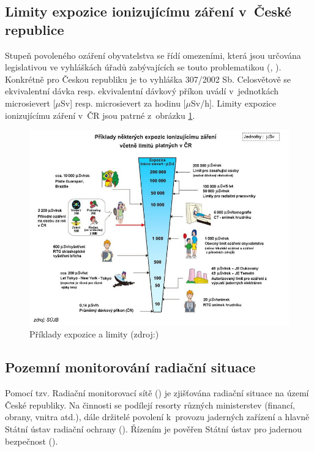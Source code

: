 \subsection{Limity expozice ionizujícímu záření v~České republice}
\label{sub:limity} Stupeň povoleného ozáření obyvatelstva se řídí
omezeními, která jsou určována legislativou ve vyhláškách úřadů
zabývajících se touto problematikou (, ). Konkrétně
pro Českou republiku je to vyhláška 307/2002 Sb. Celosvětově se
ekvivalentní dávka resp. ekvivalentní dávkový příkon uvádí
v~jednotkách microsievert [$\mu$Sv] resp. microsievert za hodinu
[$\mu$Sv/h]. Limity expozice ionizujícímu záření v~ČR jsou patrné
z~obrázku \ref{fig:davkyCR}. \cite{suroPriRadOch}

\begin{figure}[H] \centering
    \includegraphics[scale=0.6]{./pictures/davkyCR.jpeg}
      	\caption[Příklady expozice a limity]{Příklady expozice a
limity (zdroj:\cite{suroOcek})}
    	\label{fig:davkyCR}
\end{figure}

\subsection{Pozemní monitorování radiační situace} Pomocí
tzv. Radiační monitorovací sítě () je zjišťována radiační
situace na území České republiky. Na činnosti  se podílejí
resorty různých ministerstev (financí, obrany, vnitra atd.), dále
držitelé povolení k~provozu jaderných zařízení a hlavně Státní ústav
radiační ochrany (). Řízením je pověřen Státní ústav pro
jadernou bezpečnost (). \cite{suroRMS}

